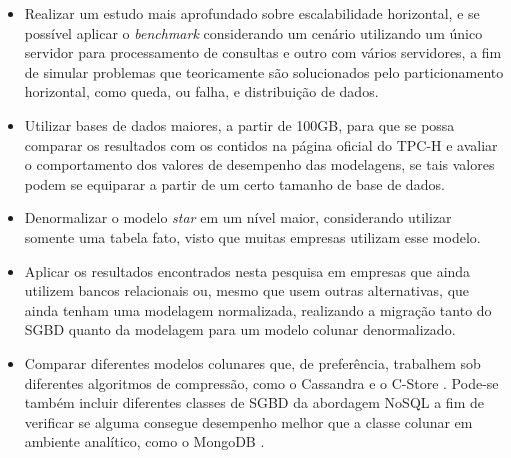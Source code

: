 \begin{itemize}
    \item Realizar um estudo mais aprofundado sobre escalabilidade horizontal, e se possível aplicar o \textit{benchmark} considerando um cenário utilizando um único servidor para processamento de consultas e outro com vários servidores, a fim de simular problemas que teoricamente são solucionados pelo particionamento horizontal, como queda, ou falha, e distribuição de dados.

    \item Utilizar bases de dados maiores, a partir de 100GB, para que se possa comparar os resultados com os contidos na página oficial do TPC-H e avaliar o comportamento dos valores de desempenho das modelagens, se tais valores podem se equiparar a partir de um certo tamanho de base de dados.

    \item Denormalizar o modelo \textit{star} em um nível maior, considerando utilizar somente uma tabela fato, visto que muitas empresas utilizam esse modelo.

    \item Aplicar os resultados encontrados nesta pesquisa em empresas que ainda utilizem bancos relacionais ou, mesmo que usem outras alternativas, que ainda tenham uma modelagem normalizada, realizando a migração tanto do SGBD quanto da modelagem para um modelo colunar denormalizado.

    \item Comparar diferentes modelos colunares que, de preferência, trabalhem sob diferentes algoritmos de compressão, como o Cassandra \cite{cassandra2018nosql} e o C-Store \cite{cstore2018nosql}. Pode-se também incluir diferentes classes de SGBD da abordagem NoSQL a fim de verificar se alguma consegue desempenho melhor que a classe colunar em ambiente analítico, como o MongoDB \cite{mongo2018nosql}.

\end{itemize}
